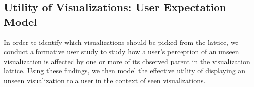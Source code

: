 \subsection{Utility of Visualizations: User Expectation Model\label{sec:utility}}
In order to identify which visualizations should be picked from the lattice, we conduct a formative user study 
to study how a user's perception of an unseen visualization is affected by one or more of its observed parent in the visualization lattice. Using these findings, we then model the effective utility of displaying an unseen visualization to a user in the context of seen visualizations.%
 

